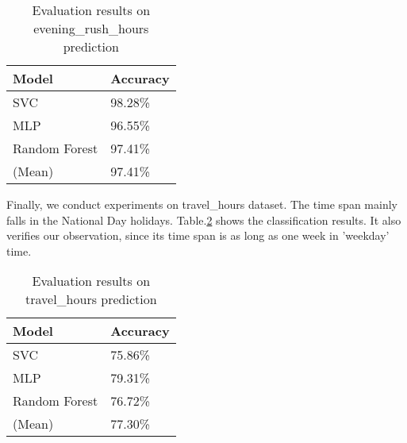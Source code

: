 \begin{table}[!htbp]
	\caption{Evaluation results on evening\_rush\_hours prediction}
	\begin{center}
		\begin{tabular}{|l|l|}
			\hline
			Model & Accuracy\\
			\hline
			SVC & 98.28\%\\
			\hline
			MLP & 96.55\%\\
			\hline
			Random Forest & 97.41\%\\
			\hline
			(Mean) & 97.41\%\\
			\hline
		\end{tabular}
		\label{tab9}
	\end{center}
\end{table}
Finally, we conduct experiments on travel\_hours dataset. The time span mainly falls in the National Day holidays. Table.\ref{tab10} shows the classification results. It also verifies our observation, since its time span is as long as one week in 'weekday' time.

\begin{table}[!htbp]
	\caption{Evaluation results on travel\_hours prediction}
	\begin{center}
		\begin{tabular}{|l|l|}
			\hline
			Model & Accuracy\\
			\hline
			SVC & 75.86\%\\
			\hline
			MLP & 79.31\%\\
			\hline
			Random Forest & 76.72\%\\
			\hline
			(Mean) & 77.30\%\\
			\hline
		\end{tabular}
		\label{tab10}
	\end{center}
\end{table}
